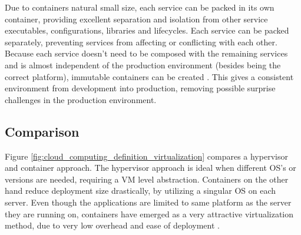 Due to containers natural small size, each service can be packed in its own container, providing excellent separation and isolation from other service executables, configurations, libraries and lifecycles. Each service can be packed separately, preventing services from affecting or conflicting with each other. Because each service doesn't need to be composed with the remaining services and is almost independent of the production environment (besides being the correct platform), immutable containers can be created \cite{kubernetes_what_is}. This gives a consistent environment from development into production, removing possible surprise challenges in the production environment.

\subsection{Comparison}
Figure \ref{fig:cloud_computing_definition_virtualization} compares a hypervisor and container approach. The hypervisor approach is ideal when different OS's or versions are needed, requiring a VM level abstraction\cite{bernstein2014containers}. Containers on the other hand reduce deployment size drastically, by utilizing a singular OS on each server. Even though the applications are limited to same platform as the server they are running on, containers have emerged as a very attractive virtualization method, due to very low overhead and ease of deployment \cite{fink2014docker}.



